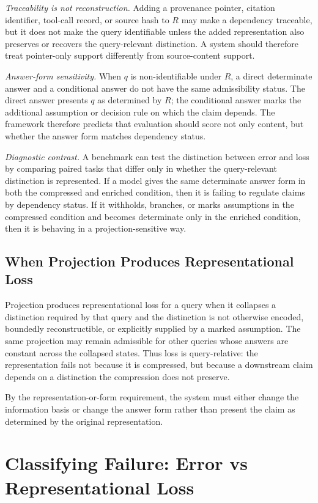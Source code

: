 \documentclass[11pt]{article}
\begin{document}
\emph{Traceability is not reconstruction.}
Adding a provenance pointer, citation identifier, tool-call record, or source hash to $R$ may make a dependency traceable, but it does not make the query identifiable unless the added representation also preserves or recovers the query-relevant distinction. A system should therefore treat pointer-only support differently from source-content support.

\emph{Answer-form sensitivity.}
When $q$ is non-identifiable under $R$, a direct determinate answer and a conditional answer do not have the same admissibility status. The direct answer presents $q$ as determined by $R$; the conditional answer marks the additional assumption or decision rule on which the claim depends. The framework therefore predicts that evaluation should score not only content, but whether the answer form matches dependency status.

\emph{Diagnostic contrast.}
A benchmark can test the distinction between error and loss by comparing paired tasks that differ only in whether the query-relevant distinction is represented. If a model gives the same determinate answer form in both the compressed and enriched condition, then it is failing to regulate claims by dependency status. If it withholds, branches, or marks assumptions in the compressed condition and becomes determinate only in the enriched condition, then it is behaving in a projection-sensitive way.

\subsection{When Projection Produces Representational Loss}

Projection produces representational loss for a query when it collapses a distinction required by that query and the distinction is not otherwise encoded, boundedly reconstructible, or explicitly supplied by a marked assumption. The same projection may remain admissible for other queries whose answers are constant across the collapsed states. Thus loss is query-relative: the representation fails not because it is compressed, but because a downstream claim depends on a distinction the compression does not preserve.

By the representation-or-form requirement, the system must either change the information basis or change the answer form rather than present the claim as determined by the original representation.

\section{Classifying Failure: Error vs Representational Loss}
\end{document}
